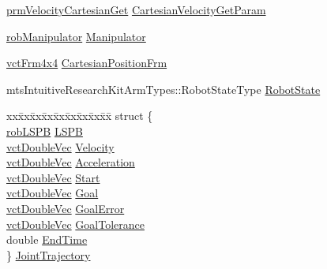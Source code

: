 \begin{DoxyCompactItemize}
\item 
\hyperlink{classprm_velocity_cartesian_get}{prm\+Velocity\+Cartesian\+Get} \hyperlink{classmts_intuitive_research_kit_arm_a1b90c6afd8759c41e232547e12586509}{Cartesian\+Velocity\+Get\+Param}
\item 
\hyperlink{classrob_manipulator}{rob\+Manipulator} \hyperlink{classmts_intuitive_research_kit_arm_a23c8e64cf6cf630a5410cf433995c403}{Manipulator}
\item 
\hyperlink{vct_transformation_types_8h_a33da47f4deb2556b37a69a2c44b29d75}{vct\+Frm4x4} \hyperlink{classmts_intuitive_research_kit_arm_ae5daa9b91ff92c29f280815c118e6520}{Cartesian\+Position\+Frm}
\item 
mts\+Intuitive\+Research\+Kit\+Arm\+Types\+::\+Robot\+State\+Type \hyperlink{classmts_intuitive_research_kit_arm_a228b8565cffee0c6d9b1c756d0f0deec}{Robot\+State}
\item 
\begin{tabbing}
xx\=xx\=xx\=xx\=xx\=xx\=xx\=xx\=xx\=\kill
struct \{\\
\>\hyperlink{classrob_l_s_p_b}{robLSPB} \hyperlink{classmts_intuitive_research_kit_arm_a9643169688f8e9ab2a85bead9d5c9300}{LSPB}\\
\>\hyperlink{vct_dynamic_vector_types_8h_ade4b3068c86fb88f41af2e5187e491c2}{vctDoubleVec} \hyperlink{classmts_intuitive_research_kit_arm_a54046b45c03a94fcacb9a3b335a19c0a}{Velocity}\\
\>\hyperlink{vct_dynamic_vector_types_8h_ade4b3068c86fb88f41af2e5187e491c2}{vctDoubleVec} \hyperlink{classmts_intuitive_research_kit_arm_aeab53c900044d1cf53107b06a2216c7d}{Acceleration}\\
\>\hyperlink{vct_dynamic_vector_types_8h_ade4b3068c86fb88f41af2e5187e491c2}{vctDoubleVec} \hyperlink{classmts_intuitive_research_kit_arm_a94cbc8bebf4566ca94cb03cc007186f7}{Start}\\
\>\hyperlink{vct_dynamic_vector_types_8h_ade4b3068c86fb88f41af2e5187e491c2}{vctDoubleVec} \hyperlink{classmts_intuitive_research_kit_arm_ab8b3ea821aed3be80e1a809bb684a255}{Goal}\\
\>\hyperlink{vct_dynamic_vector_types_8h_ade4b3068c86fb88f41af2e5187e491c2}{vctDoubleVec} \hyperlink{classmts_intuitive_research_kit_arm_a74155dcbfb69272c3babae70ae0edb38}{GoalError}\\
\>\hyperlink{vct_dynamic_vector_types_8h_ade4b3068c86fb88f41af2e5187e491c2}{vctDoubleVec} \hyperlink{classmts_intuitive_research_kit_arm_a3ffd256e671710371a02aeb18e532c9d}{GoalTolerance}\\
\>double \hyperlink{classmts_intuitive_research_kit_arm_a3481873c8bd31844a5fa40cf30fb738f}{EndTime}\\
\} \hyperlink{classmts_intuitive_research_kit_arm_a4ca434f55c8432812dbd8b874f574d41}{JointTrajectory}\\


\end{tabbing}
\end{DoxyCompactItemize}
